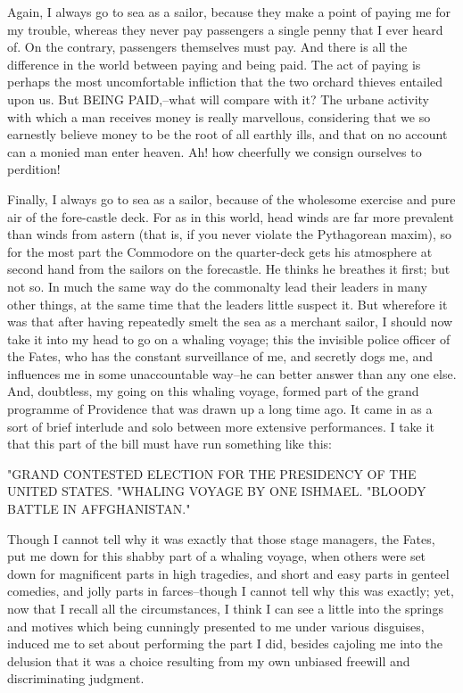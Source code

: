 Again, I always go to sea as a sailor, because they make a point of
paying me for my trouble, whereas they never pay passengers a single
penny that I ever heard of. On the contrary, passengers themselves
must pay. And there is all the difference in the world between
paying and being paid. The act of paying is perhaps the most
uncomfortable infliction that the two orchard thieves entailed upon
us. But BEING PAID,--what will compare with it? The urbane activity
with which a man receives money is really marvellous, considering
that we so earnestly believe money to be the root of all earthly
ills, and that on no account can a monied man enter heaven. Ah! how
cheerfully we consign ourselves to perdition!

Finally, I always go to sea as a sailor, because of the wholesome
exercise and pure air of the fore-castle deck. For as in this world,
head winds are far more prevalent than winds from astern (that is, if
you never violate the Pythagorean maxim), so for the most part the
Commodore on the quarter-deck gets his atmosphere at second hand from
the sailors on the forecastle. He thinks he breathes it first; but
not so. In much the same way do the commonalty lead their leaders in
many other things, at the same time that the leaders little suspect
it. But wherefore it was that after having repeatedly smelt the sea
as a merchant sailor, I should now take it into my head to go on a
whaling voyage; this the invisible police officer of the Fates, who
has the constant surveillance of me, and secretly dogs me, and
influences me in some unaccountable way--he can better answer than
any one else. And, doubtless, my going on this whaling voyage,
formed part of the grand programme of Providence that was drawn up a
long time ago. It came in as a sort of brief interlude and solo
between more extensive performances. I take it that this part of the
bill must have run something like this:

"GRAND CONTESTED ELECTION FOR THE PRESIDENCY OF THE UNITED STATES.
"WHALING VOYAGE BY ONE ISHMAEL.
"BLOODY BATTLE IN AFFGHANISTAN."

Though I cannot tell why it was exactly that those stage managers,
the Fates, put me down for this shabby part of a whaling voyage, when
others were set down for magnificent parts in high tragedies, and
short and easy parts in genteel comedies, and jolly parts in
farces--though I cannot tell why this was exactly; yet, now that I
recall all the circumstances, I think I can see a little into the
springs and motives which being cunningly presented to me under
various disguises, induced me to set about performing the part I did,
besides cajoling me into the delusion that it was a choice resulting
from my own unbiased freewill and discriminating judgment.

